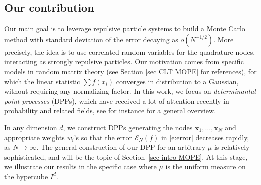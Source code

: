 \documentclass[a4paper,11pt]{article}
\numberwithin{equation}{section}
\theoremstyle{definition}
\newcommand{\rev}[1]{#1}
\newcommand{\bv}{\mathbf}
\def\cE{\mathscr{E}}
\begin{document}


\subsection{Our contribution}
\label{s:contribution}
Our main goal is to leverage repulsive particle systems to build
a Monte Carlo method with standard deviation of the error decaying as $o(N^{-1/2})$. More precisely, the idea is to use correlated random
variables for the quadrature nodes, interacting as strongly repulsive particles. Our
motivation comes from specific models in  random matrix theory (see Section
\ref{sec CLT MOPE} for references), for which the linear statistic $\sum
f(x_i)$ converges in distribution to a Gaussian, without requiring any normalizing
factor. In this work, we focus on \emph{determinantal point processes} (DPPs),
which have received a lot of attention recently in probability and related fields, see for instance
\citep{Sos02,Lyo03,HKPV06, Joh06, KuTa12, LaMoRu15} for a general overview.




In any dimension $d$, we construct DPPs generating the
nodes $\bv x_1,\ldots,\bv x_N$ and appropriate weights $w_i$'s so that the error
$\cE_N(f)$ in \eqref{e:error} decreases rapidly, as
$N\to\infty$.
\rev{The general construction of our DPP for an arbitrary $\mu$ is relatively sophisticated, and will be the topic of Section~\ref{sec intro MOPE}. At this stage, we illustrate our results in the specific case where $\mu$ is the uniform measure on the hypercube $I^d$.}
\end{document}
